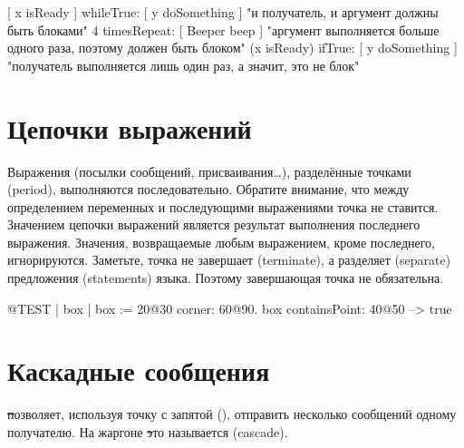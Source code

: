 \documentclass[a4paper,10pt,twoside]{book}
\begin{document}
{\begin{code}{}
[ x isReady ] whileTrue: [ y doSomething ]   "и получатель, и аргумент должны быть блоками"
4 timesRepeat: [ Beeper beep ]                   "аргумент выполняется больше одного раза, поэтому должен быть блоком"
(x isReady) ifTrue: [ y doSomething ]           "получатель выполняется лишь один раз, а значит, это не блок"
\end{code}

\section{Цепочки выражений}
Выражения (\ie посылки сообщений, присваивания\dots), разделённые точками (period), выполняются последовательно.
Обратите внимание, что между определением переменных и последующими выражениями точка не ставится.
Значением цепочки выражений является результат выполнения последнего выражения. Значения, возвращаемые
любым выражением, кроме последнего, игнорируются. Заметьте, точка не завершает (terminate), а разделяет (separate) предложения (statements) языка. Поэтому завершающая точка не обязательна.

\begin{code}{@TEST}
| box |
box := 20@30 corner: 60@90.
box containsPoint: 40@50 --> true
\end{code}

\section{Каскадные сообщения}
\st позволяет, используя точку с запятой (\ct{;}), отправить несколько сообщений одному получателю. На жаргоне \st это называется  (cascade).

}
\end{document}
